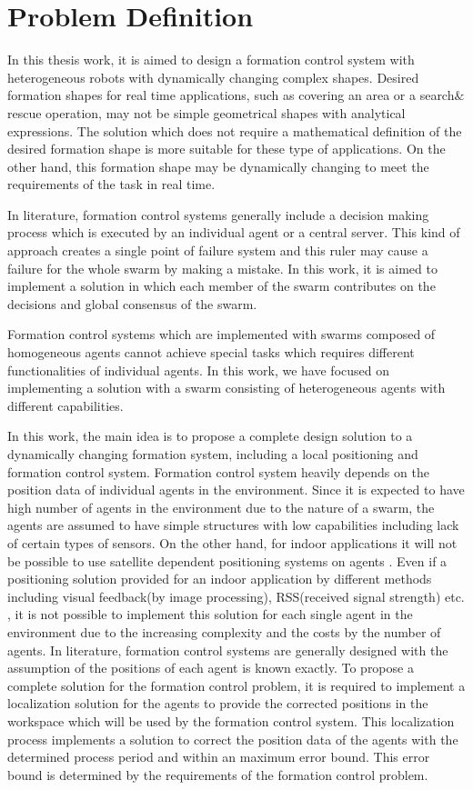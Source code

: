 \section{Problem Definition}
In this thesis work, it is aimed to design a formation control system with heterogeneous robots with dynamically changing complex shapes. Desired formation shapes for real time applications, such as covering an area or a search$\&$rescue operation, may not be simple geometrical shapes with analytical expressions. The solution which does not require a mathematical definition of the desired formation shape is more suitable for these type of applications. On the other hand, this formation shape may be dynamically changing to meet the requirements of the task in real time. 

In literature, formation control systems generally include a decision making process which is executed by an individual agent or a central server. This kind of approach creates a single point of failure system and this ruler may cause a failure for the whole swarm by making a mistake. In this work, it is aimed to implement a solution in which each member of the swarm contributes on the decisions and global consensus of the swarm.

Formation control systems which are implemented with swarms composed of homogeneous agents cannot achieve special tasks which requires different functionalities of individual agents. In this work, we have focused on implementing a solution with a swarm consisting of heterogeneous agents with different capabilities. 

In this work, the main idea is to propose a complete design solution to a dynamically changing formation system, including a local positioning and formation control system. Formation control system heavily depends on the position data of individual agents in the environment. Since it is expected to have high number of agents in the environment due to the nature of a swarm, the agents are assumed to have simple structures with low capabilities including lack of certain types of sensors. On the other hand, for indoor applications it will not be possible to use satellite dependent positioning systems on agents \cite{19}. Even if a positioning solution provided for an indoor application by different methods including visual feedback(by image processing), RSS(received signal strength) etc. , it is not possible to implement this solution for each single agent in the environment due to the increasing complexity and the costs by the number of agents. In literature, formation control systems are generally designed with the assumption of the positions of each agent is known exactly. To propose a complete solution for the formation control problem, it is required to implement a localization solution for the agents to provide the corrected positions in the workspace which will be used by the formation control system. This localization process implements a solution to correct the position data of the agents with the determined process period and within an maximum error bound. This error bound is determined by the requirements of the formation control problem. 

